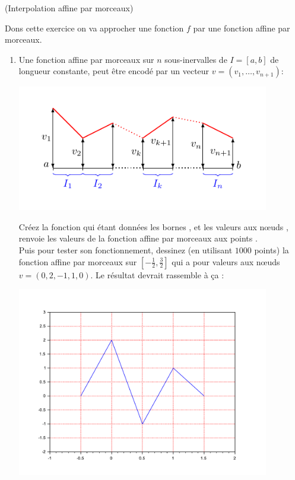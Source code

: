 \documentclass[a4paper,12pt,reqno]{amsart}
\begin{document}
\begin{exo} (Interpolation affine par morceaux)

  Dons cette exercice on va approcher une fonction $f$ par une fonction affine par morceaux.
  \begin{enumerate}
    \item Une fonction affine par morceaux sur $n$ sous-inervalles de $I=[a,b]$ de longueur constante, peut être encodé par un vecteur $v=(v_{1},\ldots,v_{n+1})$:
    \begin{center}
      \includegraphics[width=11cm]{AffineParMorceaux.pdf}
    \end{center}
    Créez la fonction  qui étant données les bornes ,  et les valeurs aux nœuds , renvoie les valeurs  de la fonction affine par morceaux aux points .\\
    Puis pour tester son fonctionnement, dessinez (en utilisant $1000$ points) la fonction affine par morceaux sur $[-\frac12, \frac32]$ qui a pour valeurs aux nœuds $v=(0,2,-1,1,0)$. Le résultat devrait rassemble à ça :
    \begin{center}
      \includegraphics[width=11cm]{SciLab_test_affine}
    \end{center}


\end{enumerate}
\end{exo}
\end{document}
